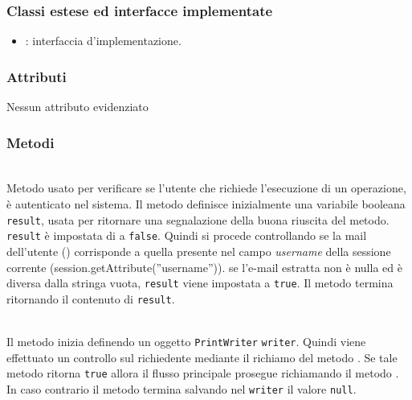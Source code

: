 \subsubsection*{Classi estese ed interfacce implementate}

\begin{itemize}
	\item {}: interfaccia d'implementazione.
\end{itemize}

\subsubsection*{Attributi}

Nessun attributo evidenziato

\subsubsection*{Metodi}

\begin{description}
	\item{}\\
	Metodo usato per verificare se l'utente che richiede l'esecuzione di un operazione, è autenticato nel sistema. Il metodo definisce inizialmente una variabile booleana \texttt{result}, usata per ritornare una segnalazione della buona riuscita del metodo. \texttt{result} è impostata di  a \texttt{false}. Quindi si procede controllando se la mail dell'utente () corrisponde a quella presente nel campo \textit{username} della sessione corrente (session.getAttribute(''username'')). se l'e-mail estratta non è nulla ed è diversa dalla stringa vuota, \texttt{result} viene impostata a \texttt{true}. Il metodo termina ritornando il contenuto di \texttt{result}.
	
	\item{}\\
	Il metodo inizia definendo un oggetto \texttt{PrintWriter} \texttt{writer}. Quindi viene effettuato un controllo sul richiedente mediante il richiamo del metodo . Se tale metodo ritorna \texttt{true} allora il flusso principale prosegue richiamando il metodo . In caso contrario il metodo termina salvando nel \texttt{writer} il valore \texttt{null}.
\end{description}

